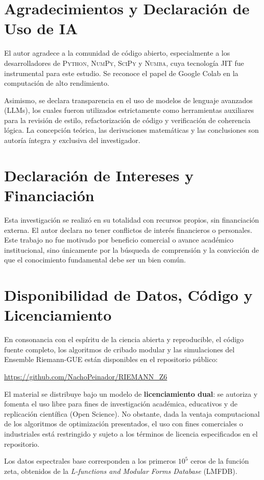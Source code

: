 \documentclass[12pt, a4paper]{article}
\theoremstyle{plain}
\theoremstyle{definition}
\theoremstyle{remark}
\begin{document}
\section*{Agradecimientos y Declaración de Uso de IA}
El autor agradece a la comunidad de código abierto, especialmente a los desarrolladores de \textsc{Python}, \textsc{NumPy}, \textsc{SciPy} y \textsc{Numba}, cuya tecnología JIT fue instrumental para este estudio. Se reconoce el papel de Google Colab en la computación de alto rendimiento.

Asimismo, se declara transparencia en el uso de modelos de lenguaje avanzados (LLMs), los cuales fueron utilizados estrictamente como herramientas auxiliares para la revisión de estilo, refactorización de código y verificación de coherencia lógica. La concepción teórica, las derivaciones matemáticas y las conclusiones son autoría íntegra y exclusiva del investigador.

\section*{Declaración de Intereses y Financiación}
Esta investigación se realizó en su totalidad con recursos propios, sin financiación externa. El autor declara no tener conflictos de interés financieros o personales. Este trabajo no fue motivado por beneficio comercial o avance académico institucional, sino únicamente por la búsqueda de comprensión y la convicción de que el conocimiento fundamental debe ser un bien común.

\section*{Disponibilidad de Datos, Código y Licenciamiento}
En consonancia con el espíritu de la ciencia abierta y reproducible, el código fuente completo, los algoritmos de cribado modular y las simulaciones del Ensemble Riemann-GUE están disponibles en el repositorio público:
\begin{center}
\url{https://github.com/NachoPeinador/RIEMANN_Z6}
\end{center}
El material se distribuye bajo un modelo de \textbf{licenciamiento dual}: se autoriza y fomenta el uso libre para fines de investigación académica, educativos y de replicación científica (Open Science). No obstante, dada la ventaja computacional de los algoritmos de optimización presentados, el uso con fines comerciales o industriales está restringido y sujeto a los términos de licencia especificados en el repositorio.

Los datos espectrales base corresponden a los primeros $10^5$ ceros de la función zeta, obtenidos de la \textit{L-functions and Modular Forms Database} (LMFDB).
\end{document}
